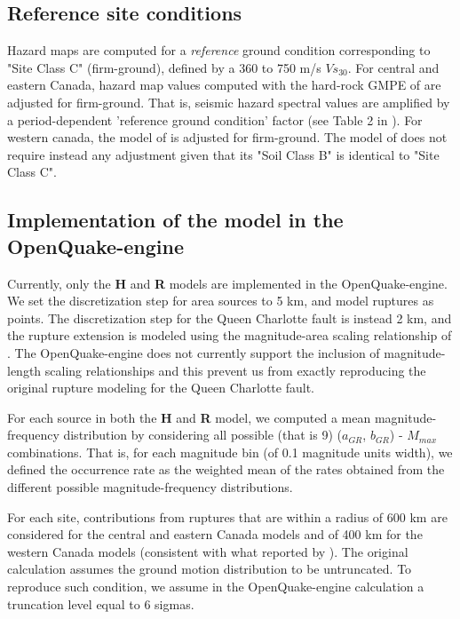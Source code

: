 \subsection{Reference site conditions}
Hazard maps are computed for a \textit{reference} ground condition corresponding to "Site Class C" (firm-ground), defined by a 360 to 750 m/s $Vs_{30}$. For central and eastern Canada, hazard map values computed with the hard-rock GMPE of \citet{ab1995} are adjusted for firm-ground. That is, seismic hazard spectral values are amplified by a period-dependent 'reference ground condition' factor (see Table 2 in \cite{adams2003}). For western canada, the model of \citet{y1997} is adjusted for firm-ground. The model of \citet{bjf1993} does not require instead any adjustment given that its "Soil Class B" is identical to "Site Class C".

\subsection{Implementation of the model in the OpenQuake-engine}
Currently, only the \textbf{H} and \textbf{R} models are implemented in the OpenQuake-engine. We set the discretization step for area sources to 5 km, and model ruptures as points. The discretization step for the Queen Charlotte fault is instead 2 km, and the rupture extension is modeled using the magnitude-area scaling relationship of \citet{wells1994}. The OpenQuake-engine does not currently support the inclusion of magnitude-length scaling relationships and this prevent us from exactly reproducing the original rupture modeling for the Queen Charlotte fault.

For each source in both the \textbf{H} and \textbf{R} model, we computed a mean magnitude-frequency distribution by considering all possible (that is 9) ($a_{GR}$, $b_{GR}$) - $M_{max}$ combinations. That is, for each magnitude bin (of 0.1 magnitude units width), we defined the occurrence rate as the weighted mean of the rates obtained from the different possible magnitude-frequency distributions.

For each site, contributions from ruptures that are within a radius of 600 km are considered for the central and eastern Canada models and of 400 km for the western Canada models (consistent with what reported by \cite{adams2003}). The original calculation assumes the ground motion distribution to be untruncated. To reproduce such condition, we assume in the OpenQuake-engine calculation a truncation level equal to 6 sigmas.

